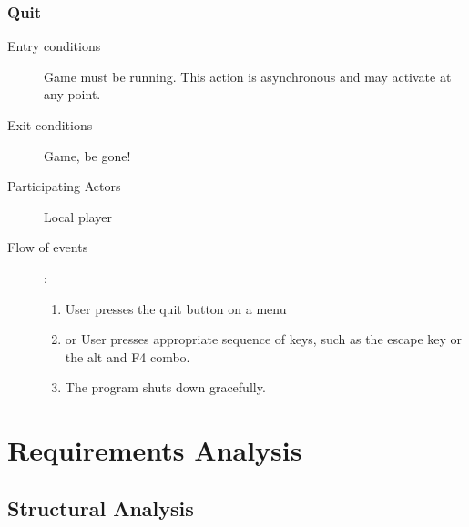 \documentclass[12pt]{article}
\begin{document}
    \subsubsection{Quit}
    \begin{description}
        \item[Entry conditions] Game must be running. This action is
            asynchronous and may activate at any point.
        \item[Exit conditions] Game, be gone!
        \item[Participating Actors] Local player
        \item[Flow of events]:
            \begin{enumerate}
                \item User presses the quit button on a menu
                \item or User presses appropriate sequence of keys, such as
                    the escape key or the alt and F4 combo.
                \item The program shuts down gracefully.
            \end{enumerate}
    \end{description}






\section{Requirements Analysis}

\subsection{Structural Analysis}\label{struct-analysis-BC}
\end{document}
